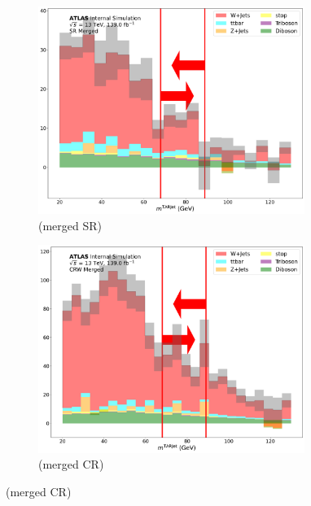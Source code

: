 \begin{figure}[htbp]
      \begin{subfigure}{0.45\textwidth}
     \includegraphics[width = 0.95\textwidth]{Figures/App_SR_CR_distributions/SR1L_Merged/TARJets10_mTAR0_N_1.pdf}
    \caption{\mTAR (merged SR)}
     \end{subfigure}
    \begin{subfigure}{0.45\textwidth}
     \includegraphics[width = 0.95\textwidth]{Figures/App_SR_CR_distributions/CRW_Merged/TARJets10_mTAR0_N_1.pdf}
     \caption{\mTAR (merged \wjets CR)}
     \end{subfigure}


\end{figure}
